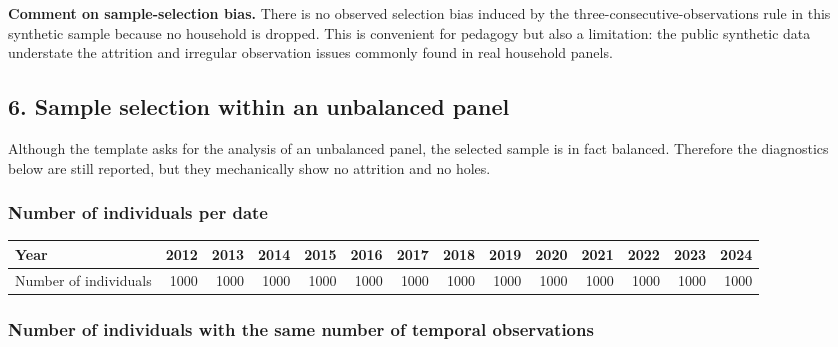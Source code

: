 \documentclass[a4paper,11pt]{article}
\renewcommand{\_}{\textunderscore\allowbreak}
\renewcommand{\arraystretch}{1.25}
\begin{document}
\textbf{Comment on sample-selection bias.} There is no observed
selection bias induced by the three-consecutive-observations rule in
this synthetic sample because no household is dropped. This is
convenient for pedagogy but also a limitation: the public synthetic data
understate the attrition and irregular observation issues commonly found
in real household panels.

\hypertarget{sample-selection-within-an-unbalanced-panel}{%
\subsection{6. Sample selection within an unbalanced
panel}\label{sample-selection-within-an-unbalanced-panel}}

Although the template asks for the analysis of an unbalanced panel, the
selected sample is in fact balanced. Therefore the diagnostics below are
still reported, but they mechanically show no attrition and no holes.

\hypertarget{number-of-individuals-per-date}{%
\subsubsection{Number of individuals per
date}\label{number-of-individuals-per-date}}

\begin{center}
\begingroup
\small
\setlength{\tabcolsep}{5pt}
\renewcommand{\arraystretch}{1.25}
\begin{adjustbox}{max width=\textwidth}
\begin{tabular}{lrrrrrrrrrrrrr}
\toprule
Year & 2012 & 2013 & 2014 & 2015 & 2016 & 2017 & 2018 & 2019 & 2020 & 2021 & 2022 & 2023 & 2024 \\
\midrule
Number of individuals & 1000 & 1000 & 1000 & 1000 & 1000 & 1000 & 1000 & 1000 & 1000 & 1000 & 1000 & 1000 & 1000 \\
\bottomrule
\end{tabular}
\end{adjustbox}
\endgroup
\end{center}

\hypertarget{number-of-individuals-with-the-same-number-of-temporal-observations}{%
\subsubsection{Number of individuals with the same number of temporal
observations}\label{number-of-individuals-with-the-same-number-of-temporal-observations}}
\end{document}
